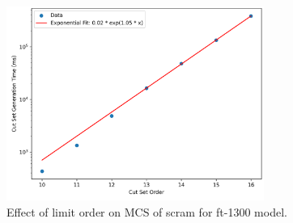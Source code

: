 \begin{figure}[h!]
    \centering
    \includegraphics[width=0.75\textwidth]{3_identifying_gaps/benchmarking/profiling_methods/figures/ft_1300.png}
    \caption{Effect of limit order on MCS of scram for ft-1300 model.}
    \label{fig:ft_1300}
\end{figure}